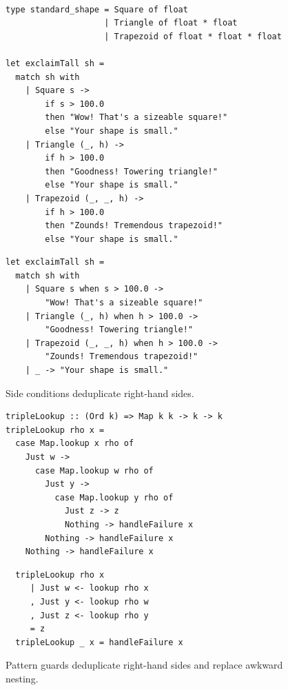 \documentclass[runningheads]{llncs}
\begin{document}
\begin{figure}[t]
\centering
\begin{minipage}{0.45\linewidth}
\scriptsize
\begin{verbatim}

type standard_shape = Square of float 
                    | Triangle of float * float
                    | Trapezoid of float * float * float

let exclaimTall sh =
  match sh with 
    | Square s -> 
        if s > 100.0 
        then "Wow! That's a sizeable square!"
        else "Your shape is small." 
    | Triangle (_, h) -> 
        if h > 100.0 
        then "Goodness! Towering triangle!"
        else "Your shape is small." 
    | Trapezoid (_, _, h) -> 
        if h > 100.0
        then "Zounds! Tremendous trapezoid!"
        else "Your shape is small." 
\end{verbatim}
\caption*{OCaml, without using~side~conditions}
\end{minipage}
\hfill
\begin{minipage}{0.45\linewidth}
\scriptsize
\begin{verbatim}
let exclaimTall sh =
  match sh with 
    | Square s when s > 100.0 ->
        "Wow! That's a sizeable square!"
    | Triangle (_, h) when h > 100.0 ->
        "Goodness! Towering triangle!"
    | Trapezoid (_, _, h) when h > 100.0 -> 
        "Zounds! Tremendous trapezoid!"
    | _ -> "Your shape is small." 
\end{verbatim}
\caption*{OCaml, using side conditions}
\end{minipage}
\caption{Side conditions deduplicate right-hand sides.}
\label{fig:pmsideconditions}
\end{figure}
\begin{figure}[t]
\centering
\begin{minipage}{0.47\linewidth}
\scriptsize
\begin{verbatim}
tripleLookup :: (Ord k) => Map k k -> k -> k
tripleLookup rho x =
  case Map.lookup x rho of
    Just w ->
      case Map.lookup w rho of
        Just y ->
          case Map.lookup y rho of
            Just z -> z
            Nothing -> handleFailure x
        Nothing -> handleFailure x
    Nothing -> handleFailure x

\end{verbatim}
\caption*{Haskell, without using pattern guards}
\end{minipage}
\hfill
\begin{minipage}{0.47\linewidth}
\scriptsize
\begin{verbatim}
  tripleLookup rho x
     | Just w <- lookup rho x
     , Just y <- lookup rho w
     , Just z <- lookup rho y
     = z
  tripleLookup _ x = handleFailure x
\end{verbatim}
\caption*{Haskell, using pattern guards}
\end{minipage}
\caption{Pattern guards deduplicate right-hand sides and replace awkward nesting.}
\label{fig:pmguards}
\end{figure}
\end{document}
